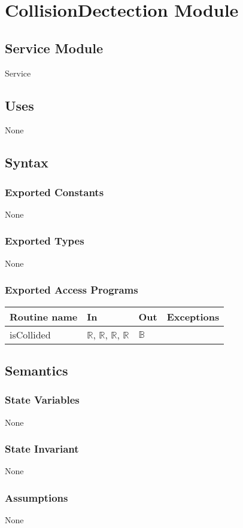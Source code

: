 \documentclass[12pt]{article}
\begin{document}
\section{CollisionDectection Module}

\subsection*{Service Module}
Service

\subsection*{Uses}
None

\subsection*{Syntax}
\subsubsection*{Exported Constants}
None
\subsubsection*{Exported Types}
None
\subsubsection*{Exported Access Programs}
\begin{tabular}{| l | l | l | p{5cm} |}
\hline
\textbf{Routine name} & \textbf{In} & \textbf{Out} & \textbf{Exceptions}\\
\hline
isCollided & $\mathbb{R}$, $\mathbb{R}$, $\mathbb{R}$, $\mathbb{R}$ & $\mathbb{B}$ & \\
\hline
\end{tabular}

\subsection*{Semantics}
\subsubsection*{State Variables}
None
\subsubsection*{State Invariant}
None
\subsubsection*{Assumptions}
None
\end{document}
